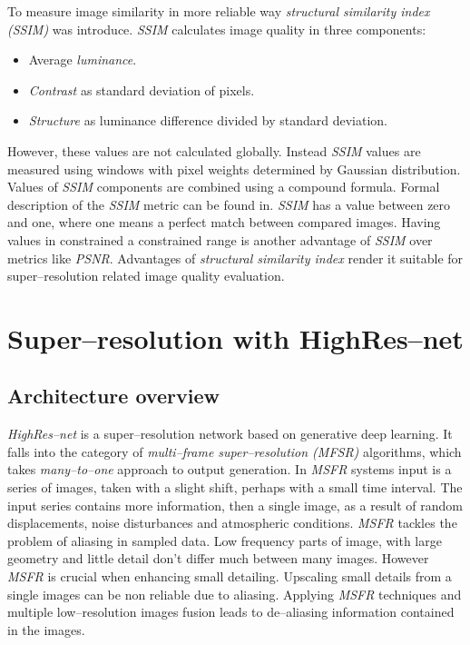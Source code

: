 To measure image similarity in more reliable way \textit{structural similarity index (SSIM)} was introduce.
\textit{SSIM} calculates image quality in three components:
\begin{itemize}
	\item Average \textit{luminance}.
	\item \textit{Contrast} as standard deviation of pixels.
	\item \textit{Structure} as luminance difference divided by standard deviation.
\end{itemize}
However, these values are not calculated globally.
Instead \textit{SSIM} values are measured using windows with pixel weights determined by Gaussian distribution.
Values of \textit{SSIM} components are combined using a compound formula.
Formal description of the \textit{SSIM} metric can be found in.
\textit{SSIM} has a value between zero and one, where one means a perfect match between compared images.
Having values in constrained a constrained range is another advantage of \textit{SSIM} over metrics like \textit{PSNR}.
Advantages of \textit{structural similarity index} render it suitable for super--resolution related image quality evaluation.

\section{Super--resolution with HighRes--net}
\subsection{Architecture overview}
\textit{HighRes--net} is a super--resolution network based on generative deep learning.
It falls into the category of \textit{multi--frame super--resolution (MFSR)} algorithms, which takes \textit{many--to--one} approach to output generation.
In \textit{MSFR} systems input is a series of images, taken with a slight shift, perhaps with a small time interval.
The input series contains more information, then a single image, as a result of random displacements, noise disturbances and atmospheric conditions.
\textit{MSFR} tackles the problem of aliasing in sampled data.
Low frequency parts of image, with large geometry and little detail don't differ much between many images.
However \textit{MSFR} is crucial when enhancing small detailing.
Upscaling small details from a single images can be non reliable due to aliasing.
Applying \textit{MSFR} techniques and multiple low--resolution images fusion leads to de--aliasing information contained in the images.

